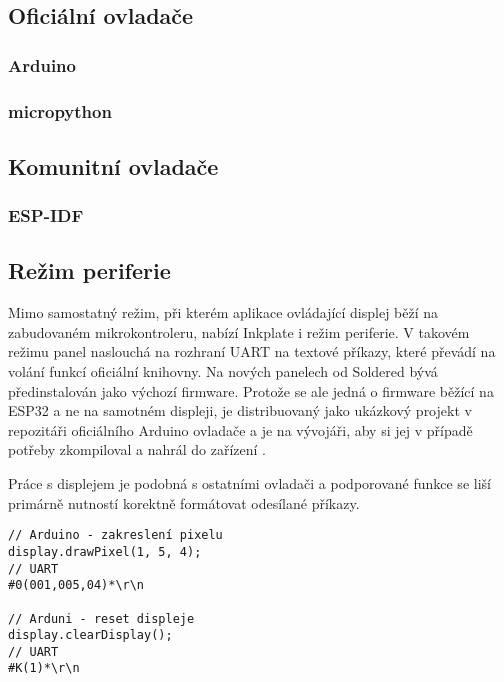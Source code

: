 \subsection{Oficiální ovladače}
\subsubsection{Arduino}

\subsubsection{micropython}

\subsection{Komunitní ovladače}
\subsubsection{ESP-IDF}

\subsection{Režim periferie}
Mimo samostatný režim, při kterém aplikace ovládající displej běží na zabudovaném mikrokontroleru, nabízí Inkplate i režim periferie. V takovém režimu panel naslouchá na rozhraní UART na textové příkazy, které převádí na volání funkcí oficiální knihovny. Na nových panelech od Soldered bývá předinstalován jako výchozí firmware. Protože se ale jedná o firmware běžící na ESP32 a ne na samotném displeji, je distribuovaný jako ukázkový projekt v repozitáři oficiálního Arduino ovladače a je na vývojáři, aby si jej v případě potřeby zkompiloval a nahrál do zařízení \cite{SolderedElectronicsInkplatePeripheralModeRaspberryPiExample2023}.

Práce s displejem je podobná s ostatními ovladači a podporované funkce se liší primárně nutností korektně formátovat odesílané příkazy.

\begin{lstlisting}[label=src:ArduinoVsPeripheral,caption={Příklady příkazů korespondujících s Arduino knihovnou \cite{solderedelectronicsInkplatePeripheralMode}:}]
// Arduino - zakreslení pixelu
display.drawPixel(1, 5, 4);
// UART
#0(001,005,04)*\r\n

// Arduni - reset displeje
display.clearDisplay();
// UART
#K(1)*\r\n
\end{lstlisting}